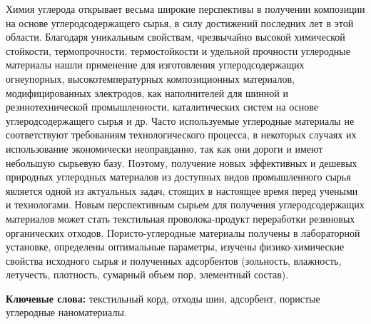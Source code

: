 Химия углерода открывает весьма широкие перспективы в получении
композиции на основе углеродсодержащего сырья, в силу достижений
последних лет в этой области. Благодаря уникальным свойствам,
чрезвычайно высокой химической стойкости, термопрочности, термостойкости
и удельной прочности углеродные материалы нашли применение для
изготовления углеродсодержащих огнеупорных, высокотемпературных
композиционных материалов, модифицированных электродов, как наполнителей
для шинной и резинотехнической промышленности, каталитических систем на
основе углеродсодержащего сырья и др. Часто используемые углеродные
материалы не соответствуют требованиям технологического процесса, в
некоторых случаях их использование экономически неоправданно, так как
они дороги и имеют небольшую сырьевую базу. Поэтому, получение новых
эффективных и дешевых природных углеродных материалов из доступных видов
промышленного сырья является одной из актуальных задач, стоящих в
настоящее время перед учеными и технологами. Новым перспективным сырьем
для получения углеродсодержащих материалов может стать текстильная
проволока-продукт переработки резиновых органических отходов.
Пористо-углеродные материалы получены в лабораторной установке,
определены оптимальные параметры, изучены физико-химические свойства
исходного сырья и полученных адсорбентов (зольность, влажность,
летучесть, плотность, сумарный объем пор, элементный состав).

{\bfseries Ключевые слова:} текстильный корд, отходы шин, адсорбент,
пористые углеродные наноматериалы.

